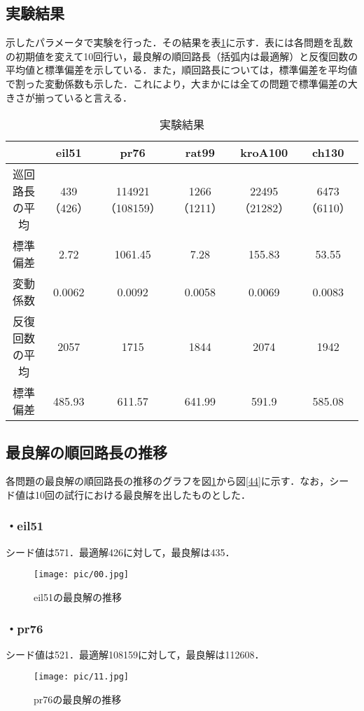 \documentclass[a4j]{jarticle}
\begin{document}
\subsection*{実験結果}
示したパラメータで実験を行った．その結果を表\ref{result}に示す．表には各問題を乱数の初期値を変えて10回行い，最良解の順回路長（括弧内は最適解）と反復回数の平均値と標準偏差を示している．また，順回路長については，標準偏差を平均値で割った変動係数も示した．これにより，大まかには全ての問題で標準偏差の大きさが揃っていると言える．

\begin{table}[H]
 \begin{center}
  \caption{実験結果}
  \label{result}
  \begin{tabular}[tb]{|c|c|c|c|c|c|} \hline
 & eil51 & pr76 & rat99 & kroA100 & ch130 \\\hline
巡回路長の平均 & 439（426） & 114921（108159） & 1266（1211） & 22495（21282） & 6473（6110） \\\hline
標準偏差 & 2.72 & 1061.45 & 7.28 & 155.83 & 53.55 \\\hline
変動係数 & 0.0062 & 0.0092 & 0.0058 & 0.0069 & 0.0083 \\ \hline
反復回数の平均 & 2057 & 1715 & 1844 & 2074 & 1942 \\\hline
標準偏差 & 485.93 & 611.57 & 641.99 & 591.9 & 585.08 \\\hline
  \end{tabular}
 \end{center}
\end{table}

\subsection*{最良解の順回路長の推移}
各問題の最良解の順回路長の推移のグラフを図\ref{00}から図\ref{44}に示す．なお，シード値は10回の試行における最良解を出したものとした．

\subsubsection*{・eil51}
シード値は571．最適解426に対して，最良解は435．
\begin{figure}[H]
 \begin{center}
  \texttt{[image: pic/00.jpg]}
  \caption{eil51の最良解の推移}
  \label{00}
 \end{center}
\end{figure}
\clearpage
\subsubsection*{・pr76}
シード値は521．最適解108159に対して，最良解は112608．
\begin{figure}[H]
 \begin{center}
  \texttt{[image: pic/11.jpg]}
  \caption{pr76の最良解の推移}
  \label{11}
 \end{center}
\end{figure}
\end{document}
